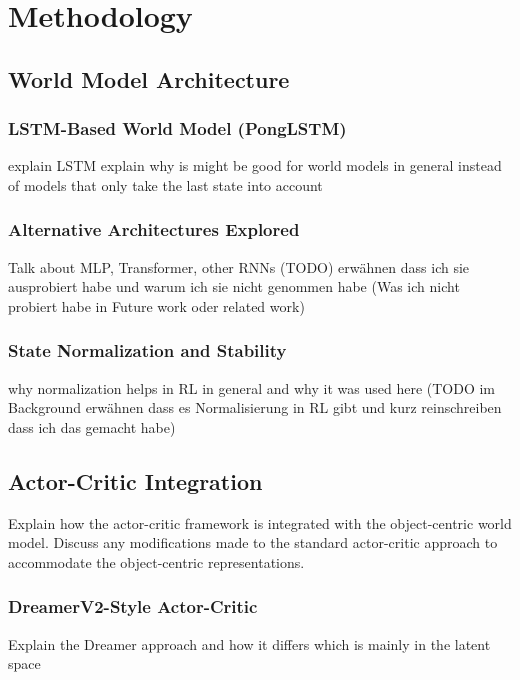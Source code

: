 \documentclass[
	english,
	ruledheaders=section,
	class=report,
	thesis={type=master},
	accentcolor=9c,
	custommargins=true,
	marginpar=false,
	parskip=half-,
	fontsize=11pt,
]{tudapub}
\begin{document}
\chapter{Methodology}
\label{chap:methodology}




\section{World Model Architecture}
\label{sec:world_model_arch}


\subsection{LSTM-Based World Model (PongLSTM)}
\label{subsec:ponglstm}
explain LSTM
explain why is might be good for world models in general instead of models that only take the last state into account

\subsection{Alternative Architectures Explored}
\label{subsec:alternative_architectures}
Talk about MLP, Transformer, other RNNs
(TODO) erwähnen dass ich sie ausprobiert habe und warum ich sie nicht genommen habe
(Was ich nicht probiert habe in Future work oder related work)

\subsection{State Normalization and Stability}
\label{subsec:normalization}
why normalization helps in RL in general and why it was used here
(TODO im Background erwähnen dass es Normalisierung in RL gibt und kurz reinschreiben dass ich das gemacht habe)

\section{Actor-Critic Integration}
\label{sec:actor_critic}
Explain how the actor-critic framework is integrated with the object-centric world model. 
Discuss any modifications made to the standard actor-critic approach to accommodate the 
object-centric representations.

\subsection{DreamerV2-Style Actor-Critic}
\label{subsec:dreamer_ac}
Explain the Dreamer approach and how it differs which is mainly in the latent space
\end{document}
